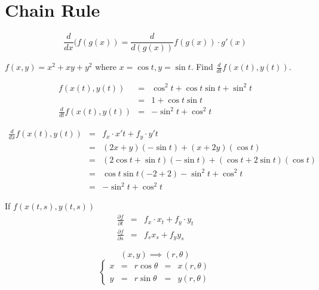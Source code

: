 \section{Chain Rule}
\begin{defn}
\[\displaystyle \frac{d}{dx} (f(g(x)) = \frac{d}{d(g(x))} f(g(x)) \cdot g'(x)\]
\end{defn}
\begin{eg}
\(f(x, y) = x^2 + xy +y^2\) where \(x = \cos t, y = \sin t\). Find \(\displaystyle \frac{d}{dt} f(x(t), y(t))\).

\[\begin{array}{ccl}
f(x(t), y(t)) & = & \cos^2 t + \cos t \sin t + \sin^2 t\\
& = & 1 + \cos t \sin t\\
\displaystyle \frac{d}{dt} f(x(t), y(t)) & = &-\sin^2 t + \cos^2 t
\end{array}\]

\[\begin{array}{rcl}
\displaystyle \frac{d}{dx} f(x(t), y(t)) & = & f_x \cdot x't + f_y \cdot y't\\
& = & (2x + y)(-\sin t) + (x + 2y)(\cos t)\\
& = & (2\cos t + \sin t)(-\sin t) + (\cos t+ 2\sin t)(\cos t)\\
& = & \cos t \sin t(-2 + 2) -\sin^2 t + \cos^2 t\\
& = & -\sin^2 t + \cos^2 t
\end{array}\]
\end{eg}
\begin{notn}
If \(f(x(t, s), y(t, s))\)
\[\begin{array}{rcl}
\displaystyle \frac{\partial f}{\partial t} & = & f_x \cdot x_t + f_y \cdot y_t\\
\displaystyle \frac{\partial f}{\partial s} & = & f_s x_s + f_y y_s
\end{array}\]
\end{notn}
\begin{eg}
\[(x, y) \implies (r, \theta)\]
\[\left\{\begin{array}{rcccl}
x & = & r\cos \theta & = & x(r, \theta)\\
y & = & r\sin \theta & = & y(r, \theta)
\end{array}\right.\]
\end{eg}
